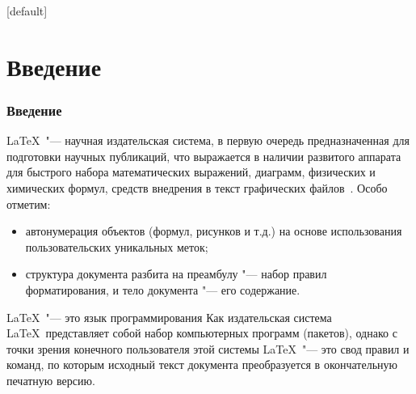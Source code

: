 \documentclass[%
10pt,
pdf,
intlimits,
sumlimits,
namelimits,
fleqn,
russian,
noamsthm,
hyperref={unicode},
utf8,
usepdftitle={false}, %
\ifdefined\aspectXVIxIX
aspectratio=169,
\else\fi
\ifdefined\printable
handout,
\else\fi
]{beamer}
\makeatletter
\newenvironment{withoutheadline}{
        \setbeamertemplate{headline}[default]
        \def\beamer@entrycode{\vspace*{-\headheight}}
    }{}
\makeatother
\begin{document}

\begin{withoutheadline}
   \begin{frame}%
      \label{frame:contents}
      \frametitle{\contentsname}
      \vbox{%
         \color{fg}
         \vspace{2em}
      }
		\vspace*{-10em}
      \begin{minipage}[t][0.5cm]{\textwidth}
         {\footnotesize
            \tableofcontents
         }
      \end{minipage}
      \vfill
   \end{frame}
\end{withoutheadline}



\section{Введение}
\label{sec:introduction}


\begin{frame}[squeeze]
	\frametitle{Введение}


	{\footnotesize
		\quad \LaTeX\ "--- научная издательская система, в первую очередь предназначенная для подготовки научных публикаций, что выражается в наличии развитого аппарата для быстрого набора математических выражений, диаграмм, физических и химических формул, средств внедрения в текст графических файлов~\cite{nasyrov:book:2019:01}.
		Особо отметим:
		\begin{itemize}[$\triangledown$]
			\item автонумерация объектов (формул, рисунков и т.д.) на основе использования пользовательских уникальных меток;
			\item структура документа разбита на преамбулу "--- набор правил форматирования, и тело документа "--- его содержание.
		\end{itemize}
		\begin{alertblock}{\LaTeX\ "--- это язык программирования}
			\label{ablock:latex_eto_yazyk_programmirovaniya}
			Как издательская система \LaTeX\ представляет собой набор компьютерных программ (пакетов), однако с точки зрения конечного пользователя этой системы \LaTeX\ "--- это свод правил и команд, по которым исходный текст документа преобразуется в окончательную печатную версию.
		\end{alertblock}
   }
\end{frame}
\end{document}
